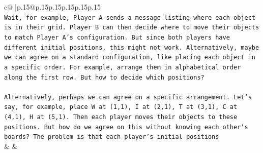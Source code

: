 \documentclass{article}
\begin{document}
{\begin{supertabular}{c@{$\;$}|p{.15\linewidth}@{}p{.15\linewidth}p{.15\linewidth}p{.15\linewidth}p{.15\linewidth}p{.15\linewidth}}
{{{\\ 
\texttt{Wait, for example, Player A sends a message listing where each object is in their grid. Player B can then decide where to move their objects to match Player A's configuration. But since both players have different initial positions, this might not work. Alternatively, maybe we can agree on a standard configuration, like placing each object in a specific order. For example, arrange them in alphabetical order along the first row. But how to decide which positions?} \\
\\ 
\texttt{Alternatively, perhaps we can agree on a specific arrangement. Let's say, for example, place W at (1,1), I at (2,1), T at (3,1), C at (4,1), H at (5,1). Then each player moves their objects to these positions. But how do we agree on this without knowing each other's boards? The problem is that each player's initial positions} \\
            }
        }
    }
    & & \\ \\


\end{supertabular}}
\end{document}
